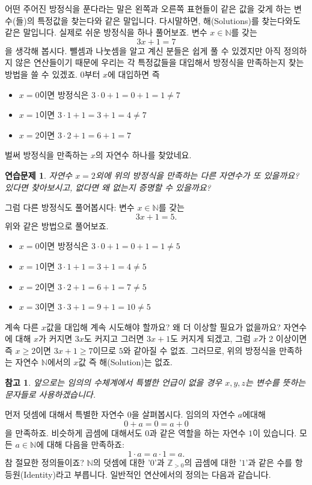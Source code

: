 \documentclass[a4paper, 11pt]{report}
\renewcommand{\<}{\langle}
\renewcommand{\>}{\rangle}
\newtheorem{remark}[thm]{참고}
\newtheorem{exercise}[thm]{연습문제}
\begin{document}
어떤 주어진 방정식을 푼다라는 말은 왼쪽과 오른쪽 표현들이 같은 값을 갖게 하는 변수(들)의
특정값을 찾는다와 같은 말입니다. 다시말하면, 해(Solutions)를 찾는다와도 같은 말입니다.
실제로 쉬운 방정식을 하나 풀어보죠. 변수 $x \in \mathbb{N}$를 갖는
$$
3x + 1 = 7
$$
을 생각해 봅시다. 뺄셈과 나눗셈을 알고 계신 분들은 쉽게 풀 수 있겠지만 아직 정의하지 않은 
연산들이기 때문에 우리는 각 특정값들을 대입해서 방정식을 만족하는지 찾는 방법을 쓸 수 있겠죠.
$0$부터 $x$에 대입하면 즉 
\begin{itemize}
  \item $x = 0$이면 방정식은 $3\cdot 0 + 1 = 0 + 1 = 1 \neq 7$
  \item $x = 1$이면 $3\cdot 1 + 1 = 3 + 1 = 4 \neq 7$
  \item $x = 2$이면 $3\cdot 2 + 1 = 6 + 1 = 7$
\end{itemize}
벌써 방정식을 만족하는 $x$의 자연수 하나를 찾았네요.

\begin{exercise}
  자연수 $x = 2$외에 위의 방정식을 만족하는 다른 자연수가 또 있을까요? 있다면 찾아보시고,
  없다면 왜 없는지 증명할 수 있을까요?
\end{exercise}

그럼 다른 방정식도 풀어봅시다: 변수 $x \in \mathbb{N}$를 갖는
$$
3x + 1 = 5.
$$
위와 같은 방법으로 풀어보죠.
\begin{itemize}
  \item $x = 0$이면 방정식은 $3\cdot 0 + 1 = 0 + 1 = 1 \neq 5$
  \item $x = 1$이면 $3\cdot 1 + 1 = 3 + 1 = 4 \neq 5$
  \item $x = 2$이면 $3\cdot 2 + 1 = 6 + 1 = 7 \neq 5$
  \item $x = 3$이면 $3\cdot 3 + 1 = 9 + 1 = 10 \neq 5$
\end{itemize}
계속 다른 $x$값을 대입해 계속 시도해야 할까요? 왜 더 이상할 필요가 없을까요? 자연수에 대해 $x$가 커지면
$3x$도 커지고 그러면 $3x+1$도 커지게 되겠고, 그럼 $x$가 2 이상이면 즉 $x \ge 2$이면 $3x + 1 \ge 7$이므로
$5$와 같아질 수 없죠. 그러므로, 위의 방정식을 만족하는 자연수 $\mathbb{N}$에서의 $x$값 즉 해(Solution)는 없죠.
\begin{remark}
  앞으로는 임의의 수체계에서 특별한 언급이 없을 경우 $x, y, z$는 변수를 뜻하는 문자들로 사용하겠습니다. 
\end{remark}
먼저 덧셈에 대해서 특별한 자연수 $0$을 살펴봅시다. 임의의 자연수 $a$에대해 
$$
0 + a = 0 = a + 0
$$
을 만족하죠. 비슷하게 곱셈에 대해서도 $0$과 같은 역할을 하는 자연수 $1$이 있습니다. 
모든 $a \in \mathbb{N}$에 대해 다음을 만족하죠:
$$
1\cdot a = a \cdot 1 = a.
$$
참 절묘한 정의들이죠? $\mathbb{N}$의 덧셈에 대한 '$0$'과 $\mathbb{Z}_{>0}$의 
곱셈에 대한 '$1$'과 같은 수를 항등원(Identity)라고 부릅니다. 일반적인 연산에서의 정의는 다음과 같습니다.
\end{document}
